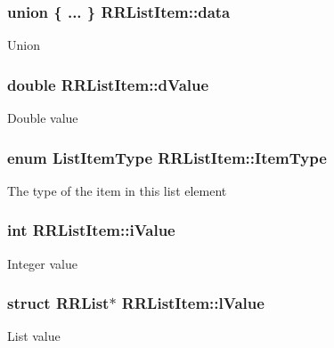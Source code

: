 \subsubsection[{data}]{\setlength{\rightskip}{0pt plus 5cm}union \{ ... \}   R\+R\+List\+Item\+::data}\label{struct_r_r_list_item_ade12f730888a69192a77e668a20fc00e}
Union \hypertarget{struct_r_r_list_item_a6d5c2beab9812853769f9a32768207c2}{}
\subsubsection[{d\+Value}]{\setlength{\rightskip}{0pt plus 5cm}double R\+R\+List\+Item\+::d\+Value}\label{struct_r_r_list_item_a6d5c2beab9812853769f9a32768207c2}
Double value \hypertarget{struct_r_r_list_item_a588ebb27c785286b9c809720be675a1d}{}
\subsubsection[{Item\+Type}]{\setlength{\rightskip}{0pt plus 5cm}enum {\bf List\+Item\+Type} R\+R\+List\+Item\+::\+Item\+Type}\label{struct_r_r_list_item_a588ebb27c785286b9c809720be675a1d}
The type of the item in this list element \hypertarget{struct_r_r_list_item_ae15de7b1f1a6471da72b9772c53cc1da}{}
\subsubsection[{i\+Value}]{\setlength{\rightskip}{0pt plus 5cm}int R\+R\+List\+Item\+::i\+Value}\label{struct_r_r_list_item_ae15de7b1f1a6471da72b9772c53cc1da}
Integer value \hypertarget{struct_r_r_list_item_a7ba0216f30cfc65a905470abcf01534d}{}
\subsubsection[{l\+Value}]{\setlength{\rightskip}{0pt plus 5cm}struct {\bf R\+R\+List}$\ast$ R\+R\+List\+Item\+::l\+Value}\label{struct_r_r_list_item_a7ba0216f30cfc65a905470abcf01534d}
List value \hypertarget{struct_r_r_list_item_acfcabe3d9036821e5631222561c69951}{}
